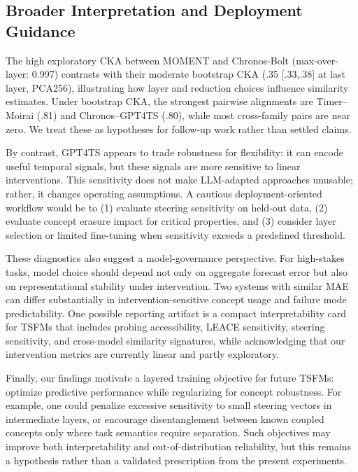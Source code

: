 \documentclass{article}
\begin{document}
\subsection{Broader Interpretation and Deployment Guidance}
\label{sec:broader_interpretation}

The high exploratory CKA between MOMENT and Chronos-Bolt (max-over-layer: 0.997) contrasts with their moderate bootstrap CKA (.35 [.33,.38] at last layer, PCA256), illustrating how layer and reduction choices influence similarity estimates. Under bootstrap CKA, the strongest pairwise alignments are Timer--Moirai (.81) and Chronos--GPT4TS (.80), while most cross-family pairs are near zero. We treat these as hypotheses for follow-up work rather than settled claims.

By contrast, GPT4TS appears to trade robustness for flexibility: it can encode useful temporal
signals, but these signals are more sensitive to linear interventions. This sensitivity does not make
LLM-adapted approaches unusable; rather, it changes operating assumptions. A cautious deployment-oriented
workflow would be to (1) evaluate steering sensitivity on held-out data, (2) evaluate concept erasure
impact for critical properties, and (3) consider layer selection or limited fine-tuning when sensitivity
exceeds a predefined threshold.

These diagnostics also suggest a model-governance perspective. For high-stakes tasks, model choice
should depend not only on aggregate forecast error but also on representational stability under
intervention. Two systems with similar MAE can differ substantially in intervention-sensitive concept usage and
failure mode predictability. One possible reporting artifact is a compact interpretability card for
TSFMs that includes probing accessibility, LEACE sensitivity, steering sensitivity, and cross-model
similarity signatures, while acknowledging that our intervention metrics are currently linear and
partly exploratory.

Finally, our findings motivate a layered training objective for future TSFMs: optimize predictive
performance while regularizing for concept robustness. For example, one could penalize excessive
sensitivity to small steering vectors in intermediate layers, or encourage disentanglement between
known coupled concepts only where task semantics require separation. Such objectives may improve both
interpretability and out-of-distribution reliability, but this remains a hypothesis rather than a
validated prescription from the present experiments.
\end{document}
